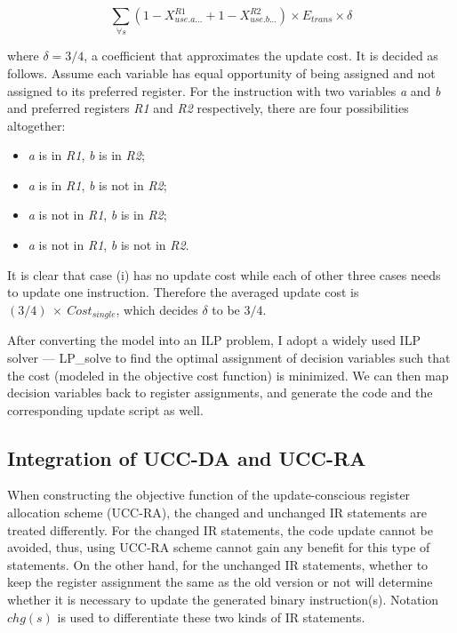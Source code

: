 \begin{small}
\begin{equation}
\sum_{\forall s}(1-X_{use.a...}^{R1} + 
1-X_{use.b...}^{R2})  \times E_{trans} \times \delta 
\end{equation}
\end{small}
\noindent

where $\delta=3/4$, a coefficient that approximates the update cost.
It is decided as follows. Assume each variable has equal opportunity
of being assigned and not assigned to its preferred register. For the
instruction with two variables {\it a} and {\it b} and preferred
registers {\it R1} and {\it R2} respectively, there are four
possibilities altogether: 
\begin{itemize}
	\item {\it a} is in {\it R1}, {\it b} is in {\it R2}; 
	\item {\it a} is in {\it R1}, {\it b} is not in {\it R2};
	\item {\it a} is not in {\it R1}, {\it b} is in {\it R2}; 
	\item {\it a} is not in {\it R1}, {\it b} is not in {\it R2}. 
\end{itemize}
It is clear that case
(i) has no update cost while each of other three cases needs to update
one instruction. Therefore the averaged update cost is $
(3/4)~\times~Cost_{single}$, which decides $\delta$ to be $3/4$.

After converting the model into an ILP problem, I adopt a widely used
ILP solver --- LP\_solve \cite{lpsolve} to find the optimal assignment
of decision variables such that the cost (modeled in the objective
cost function) is minimized.  We can then map decision variables back to
register assignments, and generate the code and the corresponding
update script as well.

\subsection{Integration of UCC-DA and UCC-RA}\label{integration}

When constructing the objective function of the update-conscious register allocation scheme (UCC-RA),
the changed and unchanged IR statements are treated differently.
For the changed IR statements, the code update cannot be avoided, thus, using UCC-RA scheme cannot
gain any benefit for this type of statements. On the other hand, for the unchanged IR statements, 
whether to keep the register assignment the same as the old version or not will determine whether
it is necessary to update the generated binary instruction(s).  Notation $chg(s)$ is used to
differentiate these two kinds of IR statements.

